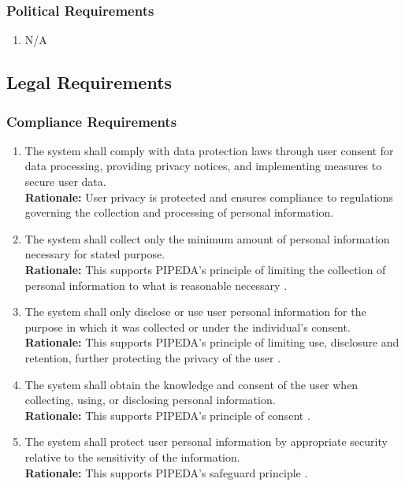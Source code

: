 \documentclass[]{article}
\begin{document}
\subsubsection{Political Requirements}
\label{ssub:political_requirements}
\begin{enumerate}[{CP-P}1. ]
	\item N/A
\end{enumerate}






\subsection{Legal Requirements}
\label{sub:legal_requirements}

\subsubsection{Compliance Requirements}
\label{ssub:compliance_requirements}
\begin{enumerate}[{LR-COMP}1. ]
	\item The system shall comply with data protection laws through user consent for data processing, 
	providing privacy notices, and implementing measures to secure user data. \\
	{\bf Rationale:} User privacy is protected and ensures compliance to regulations governing the collection and processing
	of personal information.
	\item The system shall collect only the minimum amount of personal information necessary for stated purpose. \\
	{\bf Rationale:} This supports PIPEDA's principle of limiting the collection of personal information to what is 
	reasonable necessary \cite{10c}.
	\item The system shall only disclose or use user personal information for the purpose in which it was collected or 
	under the individual's consent.\\
	{\bf Rationale:} This supports PIPEDA's principle of limiting use, disclosure and retention, further protecting the 
	privacy of the user \cite{10c}.
	\item The system shall obtain the knowledge and consent of the user when collecting, using, 
	or disclosing personal information. \\
	{\bf Rationale:} This supports PIPEDA's principle of consent \cite{10c}.
	\item The system shall protect user personal information by appropriate security relative to the 
	sensitivity of the information. \\
	{\bf Rationale:} This supports PIPEDA's safeguard principle \cite{10c}.
\end{enumerate}
\end{document}
